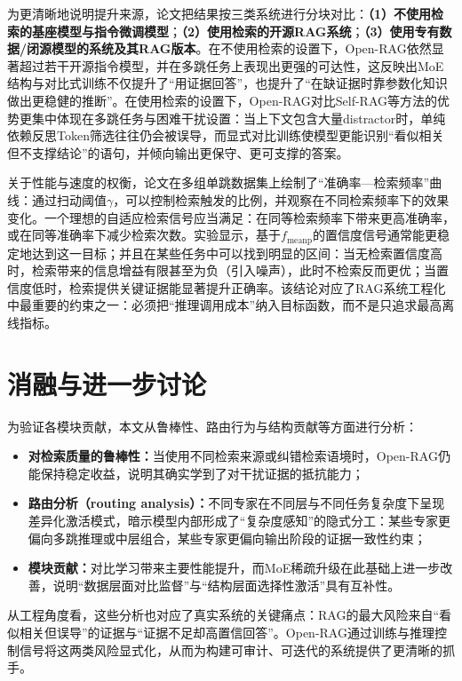 为更清晰地说明提升来源，论文把结果按三类系统进行分块对比：\textbf{（1）不使用检索的基座模型与指令微调模型}；\textbf{（2）使用检索的开源RAG系统}；\textbf{（3）使用专有数据/闭源模型的系统及其RAG版本}。在不使用检索的设置下，Open-RAG依然显著超过若干开源指令模型，并在多跳任务上表现出更强的可达性，这反映出MoE结构与对比式训练不仅提升了“用证据回答”，也提升了“在缺证据时靠参数化知识做出更稳健的推断”。在使用检索的设置下，Open-RAG对比Self-RAG等方法的优势更集中体现在多跳任务与困难干扰设置：当上下文包含大量distractor时，单纯依赖反思Token筛选往往仍会被误导，而显式对比训练使模型更能识别“看似相关但不支撑结论”的语句，并倾向输出更保守、更可支撑的答案。

关于性能与速度的权衡，论文在多组单跳数据集上绘制了“准确率—检索频率”曲线：通过扫动阈值$\gamma$，可以控制检索触发的比例，并观察在不同检索频率下的效果变化。一个理想的自适应检索信号应当满足：在同等检索频率下带来更高准确率，或在同等准确率下减少检索次数。实验显示，基于$f_{\mathrm{meanp}}$的置信度信号通常能更稳定地达到这一目标；并且在某些任务中可以找到明显的区间：当无检索置信度高时，检索带来的信息增益有限甚至为负（引入噪声），此时不检索反而更优；当置信度低时，检索提供关键证据能显著提升正确率。该结论对应了RAG系统工程化中最重要的约束之一：必须把“推理调用成本”纳入目标函数，而不是只追求最高离线指标。
 
\section{消融与进一步讨论}
为验证各模块贡献，本文从鲁棒性、路由行为与结构贡献等方面进行分析：
 
\begin{itemize}
    \item \textbf{对检索质量的鲁棒性：}当使用不同检索来源或纠错检索语境时，Open-RAG仍能保持稳定收益，说明其确实学到了对干扰证据的抵抗能力；
    \item \textbf{路由分析（routing analysis）：}不同专家在不同层与不同任务复杂度下呈现差异化激活模式，暗示模型内部形成了“复杂度感知”的隐式分工：某些专家更偏向多跳推理或中层组合，某些专家更偏向输出阶段的证据一致性约束；
    \item \textbf{模块贡献：}对比学习带来主要性能提升，而MoE稀疏升级在此基础上进一步改善，说明“数据层面对比监督”与“结构层面选择性激活”具有互补性。
\end{itemize}
 
从工程角度看，这些分析也对应了真实系统的关键痛点：RAG的最大风险来自“看似相关但误导”的证据与“证据不足却高置信回答”。Open-RAG通过训练与推理控制信号将这两类风险显式化，从而为构建可审计、可迭代的系统提供了更清晰的抓手。

